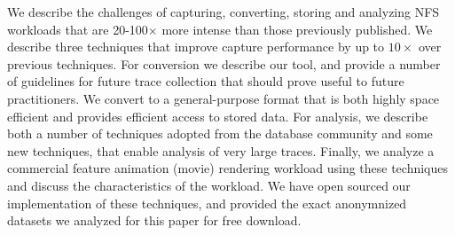 We describe the challenges of capturing, converting, storing and
analyzing NFS workloads that are 20-100$\times$ more intense than those previously
published.  We describe three techniques that improve capture performance
by up to $10\times$ over previous techniques.  
%
For conversion we describe our tool, and 
provide a number of guidelines for future trace collection that should
prove useful to future practitioners.
%
We convert 
to a general-purpose format that is both highly space efficient and provides 
efficient access to stored data.
%
For
analysis, we describe both a number of techniques adopted from the
database community and some new techniques, that enable analysis of 
very large traces.
%
Finally, we analyze a commercial feature
animation (movie) rendering workload using these techniques and discuss the
characteristics of the workload.
%
We have open sourced our implementation of these techniques, and provided
the exact anonymnized datasets we analyzed for this paper for free download.
